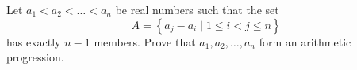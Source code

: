 Let $a_1<a_2<\ldots<a_n$ be real numbers such that the set \[A=\left\{a_j-a_i\mid1\leq i<j\leq n\right\}\] has exactly $n-1$ members. Prove that $a_1,a_2,\ldots,a_n$ form an arithmetic progression.